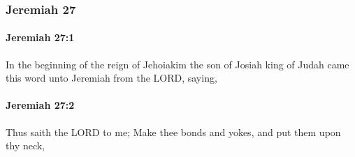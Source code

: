 	\subsubsection{Jeremiah 27} %
		\label{JEREMIAH-27}

		\paragraph{Jeremiah 27:1} %
			\label{JEREMIAH-27-1}

			In the beginning of the reign of Jehoiakim the son of Josiah king of Judah came this word unto Jeremiah from the LORD, saying,


		\paragraph{Jeremiah 27:2} %
			\label{JEREMIAH-27-2}

			Thus saith the LORD to me; Make thee bonds and yokes, and put them upon thy neck,

